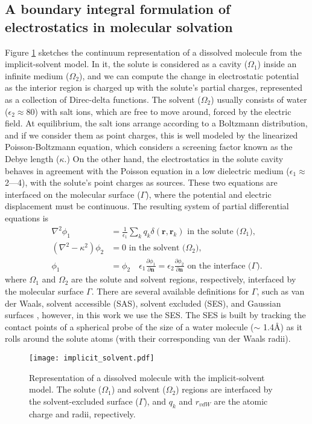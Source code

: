 \subsection{A boundary integral formulation of electrostatics in molecular solvation}

Figure \ref{fig:implicit_solvent} sketches the continuum representation of a dissolved molecule from the implicit-solvent model. 
In it, the solute is considered as a cavity ($\Omega_1$) inside an infinite medium ($\Omega_2$), and we can compute the change in electrostatic potential as the interior region is charged up with the solute's partial charges, represented as a collection of Direc-delta functions.
The solvent ($\Omega_2$) usually consists of water ($\epsilon_2\approx$80) with salt ions, which are free to move around, forced by the electric field. 
At equilibrium, the salt ions arrange according to a Boltzmann distribution, and if we consider them as point charges, this is well modeled by the linearized Poisson-Boltzmann equation, which considers a screening factor known as the Debye length ($\kappa$.) 
On the other hand, the electrostatics in the solute cavity behaves in agreement with the Poisson equation in a low dielectric medium ($\epsilon_1\approx$2---4), with the solute's point charges as sources.
These two equations are interfaced on the molecular surface ($\Gamma$), where the potential and electric displacement must be continuous.
The resulting system of partial differential equations is
%
\begin{align} \label{eq:pde}
\nabla^2\phi_1 &= \frac{1}{\epsilon_1}\sum_k q_k\delta(\mathbf{r},\mathbf{r}_k) \text{ in the solute ($\Omega_1$),}\nonumber\\
(\nabla^2-\kappa^2)\phi_2 &= 0 \text{ in the solvent ($\Omega_2$),}\nonumber\\
\phi_1 &= \phi_2 \quad \epsilon_1\frac{\partial \phi_1}{\partial\mathbf{n}} = \epsilon_2\frac{\partial \phi_2}{\partial\mathbf{n}} \text{ on the interface ($\Gamma$)}.
\end{align}
%
where $\Omega_1$ and $\Omega_2$ are the solute and solvent regions, respectively, interfaced by the molecular surface $\Gamma$.
There are several available definitions for $\Gamma$, such as van der Waals, solvent accessible (SAS), solvent excluded (SES), and Gaussian surfaces \cite{HarrisFenley2013}, however, in this work we use the SES.
The SES is built by tracking the contact points of a spherical probe of the size of a water molecule ($\sim$ 1.4\AA) as it rolls around the solute atoms (with their corresponding van der Waals radii). 
%
\begin{figure}
\centering
\texttt{[image: implicit\_solvent.pdf]}
\caption{Representation of a dissolved molecule with the implicit-solvent model. The solute ($\Omega_1$) and solvent ($\Omega_2$) regions are interfaced by the solvent-excluded surface ($\Gamma$), and $q_k$ and $r_{vdW}$ are the atomic charge and radii, repectively.}
\label{fig:implicit_solvent}
\end{figure}

